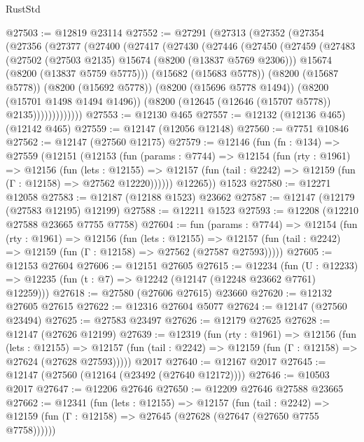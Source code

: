 \begin{lexlean}{RustStd}
\begin{coremodule}
@27503 := @12819 @23114
@27552 := @27291
    (@27313
      (@27352
        (@27354
          (@27356
            (@27377
              (@27400
                (@27417
                  (@27430
                    (@27446
                      (@27450
                        (@27459
                          (@27483
                            (@27502 (@27503 @2135) @15674 (@8200 (@13837 @5769 @2306)))
                            @15674
                            (@8200 (@13837 @5759 @5775)))
                          (@15682 (@15683 @5778))
                          (@8200 (@15687 @5778))
                          (@8200 (@15692 @5778))
                          (@8200 (@15696 @5778 @1494))
                          (@8200 (@15701 @1498 @1494 @1496))
                          (@8200 (@12645 (@12646 (@15707 @5778)) @2135)))))))))))))
@27553 := @12130 @465
@27557 := @12132 (@12136 @465) (@12142 @465)
@27559 := @12147 (@12056 @12148)
@27560 := @7751 @10846
@27562 := @12147 (@27560 @12175)
@27579 := @12146
    (fun (fn : @134) =>
    @27559
      (@12151
        (@12153
          (fun (params : @7744) =>
          @12154
            (fun (rty : @1961) =>
            @12156
              (fun (lets : @12155) =>
              @12157 (fun (tail : @2242) => @12159 (fun (Γ : @12158) => @27562 @12220))))))
        @12265))
    @1523
@27580 := @12271 @12058
@27583 := @12187 (@12188 @1523) @23662
@27587 := @12147 (@12179 (@27583 @12195) @12199)
@27588 := @12211 @1523
@27593 := @12208 (@12210 @27588 @23665 @7755 @7758)
@27604 := fun (params : @7744) =>
  @12154
    (fun (rty : @1961) =>
    @12156
      (fun (lets : @12155) =>
      @12157 (fun (tail : @2242) => @12159 (fun (Γ : @12158) => @27562 (@27587 @27593)))))
@27605 := @12153 @27604
@27606 := @12151 @27605
@27615 := @12234
    (fun (U : @12233) => @12235 (fun (t : @7) => @12242 (@12147 (@12248 @23662 @7761) @12259)))
@27618 := @27580 (@27606 @27615) @23660
@27620 := @12132 @27605 @27615
@27622 := @12316 @27604 @5077
@27624 := @12147 (@27560 @23494)
@27625 := @27583 @23497
@27626 := @12179 @27625
@27628 := @12147 (@27626 @12199)
@27639 := @12319
    (fun (rty : @1961) =>
    @12156
      (fun (lets : @12155) =>
      @12157 (fun (tail : @2242) => @12159 (fun (Γ : @12158) => @27624 (@27628 @27593)))))
    @2017
@27640 := @12167 @2017
@27645 := @12147 (@27560 (@12164 (@23492 (@27640 @12172))))
@27646 := @10503 @2017
@27647 := @12206 @27646
@27650 := @12209 @27646 @27588 @23665
@27662 := @12341
    (fun (lets : @12155) =>
    @12157
      (fun (tail : @2242) =>
      @12159 (fun (Γ : @12158) => @27645 (@27628 (@27647 (@27650 @7755 @7758))))))

\end{coremodule}
\end{lexlean}
